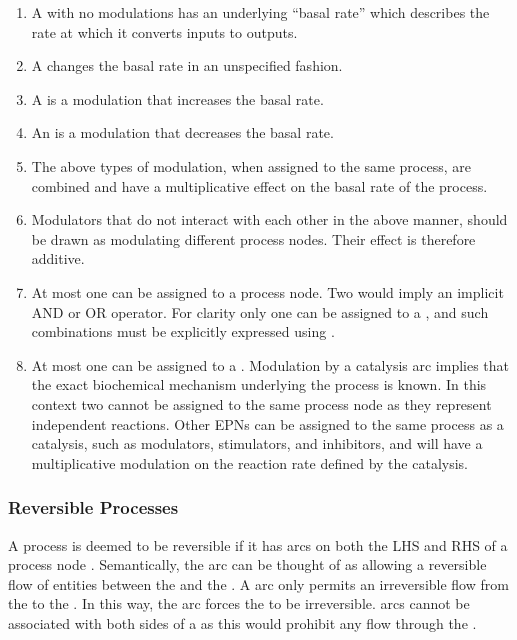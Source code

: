\begin{enumerate}
\item A  with no modulations has an underlying ``basal rate''
  which describes the rate at which it converts inputs to outputs.
\item A  changes the basal rate in an unspecified fashion.
\item A  is a modulation that increases the basal rate.
\item An  is a modulation that decreases the basal rate.
\item The above types of modulation, when assigned to the same process, are combined and have a multiplicative effect on the basal rate of the process.
\item Modulators that do not interact with each other in the above manner, should be drawn as modulating different process nodes. Their effect is therefore additive.
\item At most one  can be assigned to a process node. Two 
  would imply an implicit AND or OR operator. For clarity only
  one  can be assigned to a , and such combinations must be
  explicitly expressed using . 
\item At most one  can be assigned to a
  . Modulation by a catalysis arc implies that the exact biochemical mechanism underlying
  the process is known. In this context two  cannot
  be assigned to the same process node as they represent
  independent reactions. Other EPNs can be assigned to the same process as a catalysis, such as modulators, stimulators, and
  inhibitors, and will have a multiplicative modulation on the reaction rate defined by the catalysis.
\end{enumerate}

\subsubsection{Reversible Processes}
\label{sec: semantics reversible procs}

A process is deemed to be reversible if it has  arcs on both the LHS and RHS of a process node . Semantically, the  arc can be thought of as allowing a reversible flow of entities between the  and the . A  arc only permits an irreversible flow from the  to the . In this way, the  arc forces the  to be irreversible.  arcs cannot be associated with both sides of a  as this would prohibit any flow through the .


